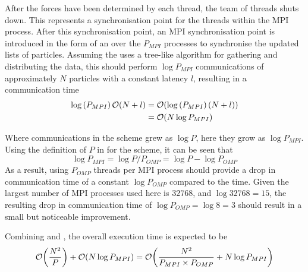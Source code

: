 %
After the forces have been determined by each thread, the team of threads
shuts down.
%
This represents a synchronisation point for the threads within the
MPI process.
%
After this \openmp{} synchronisation point,
an MPI synchronisation point is introduced in the form of
an \mpiallgatherv{} over the $P_{MPI}$ processes
to synchronise the updated lists of particles.
%
Assuming the \mpiallgatherv{} uses a tree-like algorithm for
gathering and distributing the data, this should perform
$\log{P_{MPI}}$ communications of approximately $N$ particles
with a constant latency $l$, resulting in a communication time
\begin{equation}
    \label{eqn:shared_andreplicated_communication_time}
    \begin{split}
        \log{(P_{MPI})}\,\mathcal{O}{\left({ N + l }\right)} 
            &= \mathcal{O}{\left({ \log{(P_{MPI})}\,(N+l) }\right)} \\
            &= \mathcal{O}{\left({ N\log{P_{MPI}} }\right)}
    \end{split}
\end{equation}

Where communications in the \replicateddata{} scheme grew as $\log{P}$,
here they grow as $\log{P_{MPI}}$.
%
Using the definition of $P$ in  for the
\sharedandreplicateddata{} scheme, it can be seen that
\begin{equation}
    \log{P_{MPI}} = \log{P/P_{OMP}} = \log{P} - \log{P_{OMP}}
\end{equation}
%
As a result, using $P_{OMP}$ threads per MPI process should provide
a drop in communication time of a constant $\log{P_{OMP}}$ compared
to the \replicateddata{} time.
%
Given the largest number of MPI processes used here is $32768$,
and $\log{32768} = 15$, the resulting drop in communication
time of $\log{P_{OMP}} = \log{8} = 3$ should result in a small
but noticeable improvement.


%
Combining
 and
,
the overall execution time is expected to be
\begin{equation}
    \label{eqn:shared_and_replicated_data_overall_time}
    \mathcal{O}{\left({ \frac{N^2}{P} }\right)} + \mathcal{O}{\left({ N\log{P_{MPI}} }\right)}
        = \mathcal{O}{\left({ \frac{N^2}{P_{MPI} \times{} P_{OMP}} + N\log{P_{MPI}} }\right)}
\end{equation}


